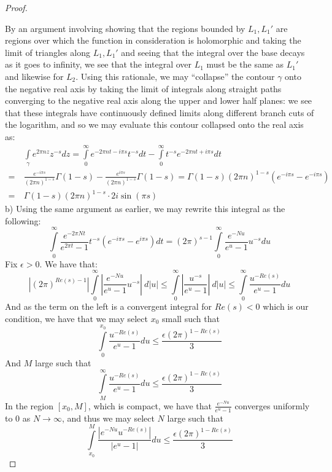 \documentclass{article}
\begin{document}
\begin{proof}
\begin{center}
\begin{tikzpicture}[x=0.75pt,y=0.75pt,yscale=-0.7,xscale=0.7]
\end{tikzpicture}
  \end{center}
  By an argument involving showing that the regions bounded by $L_{1}, L_{1}'$ are regions over which the function in consideration is holomorphic and taking the limit of triangles along $L_{1}, L_{1}'$ and seeing that the integral over the base decays as it goes to infinity, we see that the integral over $L_{1}$ must be the same as $L_{1}'$ and likewise for $L_{2}$. Using this rationale, we may ``collapse'' the contour $\gamma$ onto the negative real axis by taking the limit of integrals along straight paths converging to the negative real axis along the upper and lower half planes: we see that these integrals have continuously defined limits along different branch cuts of the logarithm, and so we may evaluate this contour collapsed onto the real axis as:
  \begin{align*}
    & \int\limits_{\gamma}^{}e^{2\pi n z}z^{-s}dz = \int\limits_{0}^{\infty}e^{-2 \pi n t - i\pi s}t^{-s} dt - \int\limits_{0}^{\infty}t^{-s}e^{-2\pi n t + i \pi s} dt \\
    = \ &  \frac{e^{-i \pi s}}{(2\pi n)^{1-s}} \Gamma(1-s) - \frac{e^{i \pi s}}{(2\pi n)^{1-s}} \Gamma(1-s) = \Gamma(1-s)(2\pi n)^{1-s}(e^{-i\pi s} - e^{-i \pi s}) \\
        = \ & \Gamma(1-s)(2\pi n)^{1-s} \cdot 2 i \sin(\pi s)
  \end{align*}
  b) Using the same argument as earlier, we may rewrite this integral as the following:
  \[
    \int\limits_{0}^{\infty}\frac{e^{-2\pi N t}}{e^{2\pi t} - 1} t^{-s}( e^{-i\pi s}  - e^{i \pi s}) dt = (2 \pi)^{s-1} \int\limits_{0}^{\infty}\frac{e^{-Nu}}{e^{u} - 1} u^{-s} du    
    \]
    Fix $\epsilon> 0$. We have that:
    \[
      |(2\pi)^{Re(s) - 1}|\int\limits_{0}^{\infty}\left|\frac{e^{-Nu}}{e^{u}-1} u^{-s}\right| \ d|u| \leq \int\limits_{0}^{\infty}\left|\frac{u^{-s}}{e^{u}-1}\right| \ d|u| \leq \int\limits_{0}^{\infty}\frac{u^{ - Re(s)}}{e^{u}-1 } du   
      \]
      And as the term on the left is a convergent integral for $Re(s) < 0$ which is our condition, we have that we may select $x_{0}$ small such that
      \[
        \int\limits_{0}^{x_{0}}\frac{u^{-Re(s)}}{e^{u}-1} du \leq \frac{\epsilon(2\pi)^{1-Re(s)}}{3}
      \]
      And $M$ large such that
      \[
        \int\limits_{M}^{\infty}\frac{u^{-Re(s)}}{e^{u}-1} du \leq \frac{\epsilon(2\pi)^{1-Re(s)}}{3}
      \]
      In the region $[x_{0}, M]$, which is compact, we have that $\frac{e^{-Nu}}{e^{u}-1}$ converges uniformly to $0$ as $N \to \infty$, and thus we may select $N$ large such that
      \[
        \int\limits_{x_{0}}^{M}\frac{|e^{-Nu}u^{-Re(s)}|}{|e^{u}-1|} du \leq \frac{\epsilon(2\pi)^{1-Re(s)}}{3}
      \]


\end{proof}
\end{document}
